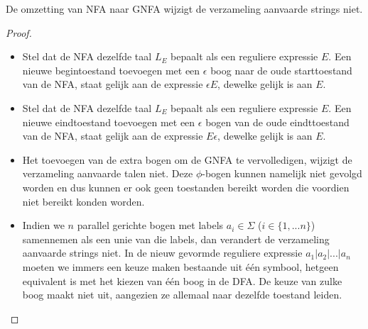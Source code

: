 \documentclass[../aanvullingen_cursus.tex]{subfiles}
\begin{document}
\begin{stelling}
	De omzetting van NFA naar GNFA wijzigt de verzameling aanvaarde strings niet.
\end{stelling}

\begin{proof}
	\hfill
	\begin{itemize}
		\item Stel dat de NFA dezelfde taal $L_E$ bepaalt als een reguliere expressie $E$. Een nieuwe begintoestand toevoegen met een $\epsilon$ boog naar de oude starttoestand van de NFA, staat gelijk aan de expressie $\epsilon E$, dewelke gelijk is aan $E$.
		\item Stel dat de NFA dezelfde taal $L_E$ bepaalt als een reguliere expressie $E$. Een nieuwe eindtoestand toevoegen met een $\epsilon$ bogen van de oude eindttoestand van de NFA, staat gelijk aan de expressie $E\epsilon$, dewelke gelijk is aan $E$.
		\item Het toevoegen van de extra bogen om de GNFA te vervolledigen, wijzigt de verzameling aanvaarde talen niet. Deze $\phi$-bogen kunnen namelijk niet gevolgd worden en dus kunnen er ook geen toestanden bereikt worden die voordien niet bereikt konden worden.
		\item Indien we \(n\) parallel gerichte bogen met labels $a_i \in \Sigma$ (\(i\in\{1,...n\}\)) samennemen als een unie van die labels, dan verandert de verzameling aanvaarde strings niet. In de nieuw gevormde reguliere expressie $a_1|a_2|...|a_n$ moeten we immers een keuze maken bestaande uit één symbool, hetgeen equivalent is met het kiezen van één boog in de DFA. De keuze van zulke boog maakt niet uit, aangezien ze allemaal naar dezelfde toestand leiden.
	\end{itemize}
\end{proof}
\end{document}
